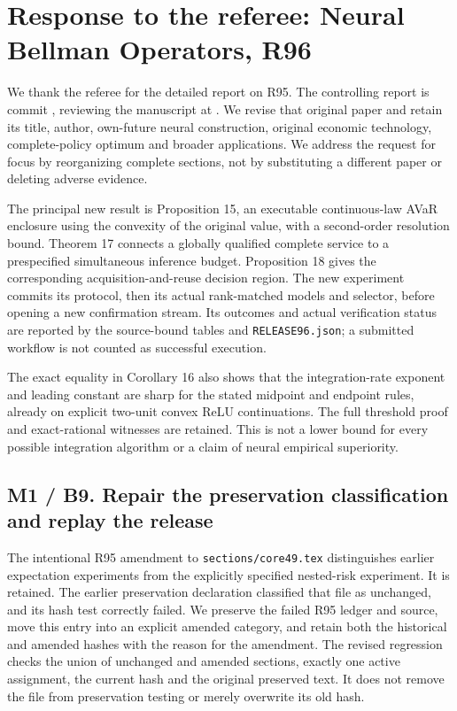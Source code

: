 \hypertarget{response-to-the-referee-neural-bellman-operators-r96}{%
\section{Response to the referee: Neural Bellman Operators,
R96}\label{response-to-the-referee-neural-bellman-operators-r96}}

We thank the referee for the detailed report on R95. The controlling
report is commit ,
reviewing the manuscript at
. We revise that original
paper and retain its title, author, own-future neural construction,
original economic technology, complete-policy optimum and broader
applications. We address the request for focus by reorganizing complete
sections, not by substituting a different paper or deleting adverse
evidence.

The principal new result is Proposition 15, an executable continuous-law
AVaR enclosure using the convexity of the original value, with a
second-order resolution bound. Theorem 17 connects a globally qualified
complete service to a prespecified simultaneous inference budget.
Proposition 18 gives the corresponding acquisition-and-reuse decision
region. The new experiment commits its protocol, then its actual
rank-matched models and selector, before opening a new confirmation
stream. Its outcomes and actual verification status are reported by the
source-bound tables and \texttt{RELEASE96.json}; a submitted workflow is
not counted as successful execution.

The exact equality in Corollary 16 also shows that the integration-rate
exponent and leading constant are sharp for the stated midpoint and
endpoint rules, already on explicit two-unit convex ReLU continuations.
The full threshold proof and exact-rational witnesses are retained. This
is not a lower bound for every possible integration algorithm or a claim
of neural empirical superiority.

\hypertarget{m1-b9.-repair-the-preservation-classification-and-replay-the-release}{%
\subsection{M1 / B9. Repair the preservation classification and replay
the
release}\label{m1-b9.-repair-the-preservation-classification-and-replay-the-release}}

The intentional R95 amendment to \texttt{sections/core49.tex}
distinguishes earlier expectation experiments from the explicitly
specified nested-risk experiment. It is retained. The earlier
preservation declaration classified that file as unchanged, and its hash
test correctly failed. We preserve the failed R95 ledger and source,
move this entry into an explicit amended category, and retain both the
historical and amended hashes with the reason for the amendment. The
revised regression checks the union of unchanged and amended sections,
exactly one active assignment, the current hash and the original
preserved text. It does not remove the file from preservation testing or
merely overwrite its old hash.

